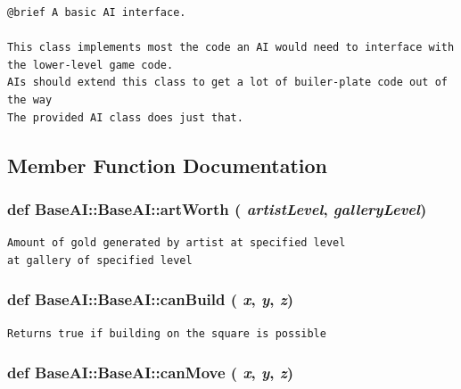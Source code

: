 \footnotesize\begin{verbatim}@brief A basic AI interface.

This class implements most the code an AI would need to interface with the lower-level game code.
AIs should extend this class to get a lot of builer-plate code out of the way
The provided AI class does just that.
\end{verbatim}
\normalsize
 

\subsection{Member Function Documentation}
\hypertarget{classBaseAI_1_1BaseAI_96f7fbd41f9da73ab203bc66bfabf290}{
\subsubsection[{artWorth}]{\setlength{\rightskip}{0pt plus 5cm}def BaseAI::BaseAI::artWorth ( {\em artistLevel}, \/   {\em galleryLevel})}}
\label{classBaseAI_1_1BaseAI_96f7fbd41f9da73ab203bc66bfabf290}




\footnotesize\begin{verbatim}Amount of gold generated by artist at specified level
at gallery of specified level
\end{verbatim}
\normalsize
 \hypertarget{classBaseAI_1_1BaseAI_e8e45448fc6bab4381fa3dd13cde748d}{
\subsubsection[{canBuild}]{\setlength{\rightskip}{0pt plus 5cm}def BaseAI::BaseAI::canBuild ( {\em x}, \/   {\em y}, \/   {\em z})}}
\label{classBaseAI_1_1BaseAI_e8e45448fc6bab4381fa3dd13cde748d}




\footnotesize\begin{verbatim}Returns true if building on the square is possible
\end{verbatim}
\normalsize
 \hypertarget{classBaseAI_1_1BaseAI_95c13bf29ef95817a34f9864906e6d7c}{
\subsubsection[{canMove}]{\setlength{\rightskip}{0pt plus 5cm}def BaseAI::BaseAI::canMove ( {\em x}, \/   {\em y}, \/   {\em z})}}
\label{classBaseAI_1_1BaseAI_95c13bf29ef95817a34f9864906e6d7c}




